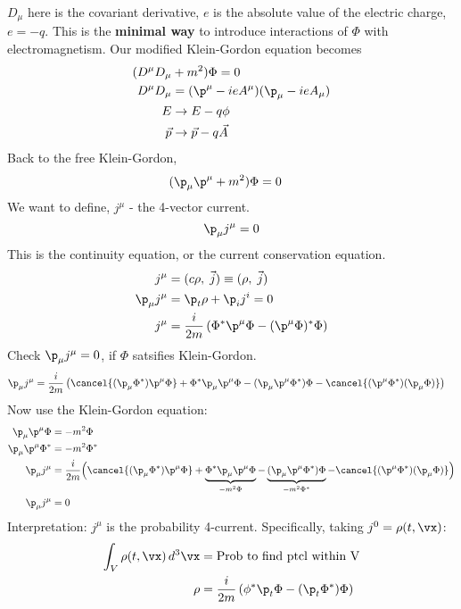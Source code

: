 \documentclass[a4paper, 11pt, normalem]{report}
\begin{document}
$D_\mu$ here is the covariant derivative, $e$ is the absolute value of the electric charge, $e = -q$.
This is the \textbf{minimal way} to introduce interactions of $\Phi$ with electromagnetism.
Our modified Klein-Gordon equation becomes
\begin{align}
    (D^\mu D_\mu &+ m^2)\Phi = 0 \\
    D^\mu D_\mu &= (\p^\mu - ieA^\mu)(\p_\mu - ieA_\mu) \\
    E &\to E - q\phi \\
    \vec{p} &\to \vec{p} - q\vec{A}
\end{align}
Back to the free Klein-Gordon,
\begin{align}
    (\p_\mu\p^\mu &+ m^2)\Phi = 0
\end{align}
We want to define, $j^\mu$ - the 4-vector current.
\begin{equation}
    \p_\mu j^\mu = 0
\end{equation}
This is the continuity equation, or the current conservation equation.
\begin{align}
    j^\mu &= (c\rho,\;\vec{j}) \equiv (\rho,\;\vec{j}) \\
    \p_\mu j^\mu &= \p_t\rho + \p_i j^i = 0 \\
    j^\mu &= \frac{i}{2m}\left(\Phi^*\p^\mu\Phi - (\p^\mu\Phi)^*\Phi\right)
\end{align}
Check $\p_\mu j^\mu = 0$, if $\Phi$ satsifies Klein-Gordon.
\begin{align}
    \p_\mu j^\mu &= \frac{i}{2m}\left(\cancel{(\p_\mu\Phi^*)\p^\mu\Phi} + \Phi^*\p_\mu\p^\mu\Phi - (\p_\mu\p^\mu\Phi^*)\Phi - \cancel{(\p^\mu\Phi^*)(\p_\mu\Phi)} \right)
\end{align}
Now use the Klein-Gordon equation:
\begin{align}
    \p_\mu\p^\mu\Phi &= -m^2\Phi \\
    \p_\mu\p^\mu\Phi^* &= -m^2\Phi^* \\
    \p_\mu j^\mu &= \frac{i}{2m}\Big(\cancel{(\p_\mu\Phi^*)\p^\mu\Phi} + \underbrace{\Phi^*\p_\mu\p^\mu\Phi}_{-m^2\Phi} - \underbrace{(\p_\mu\p^\mu\Phi^*)\Phi}_{-m^2\Phi^*} - \cancel{(\p^\mu\Phi^*)(\p_\mu\Phi)} \Big) \\
    \p_\mu j^\mu &= 0
\end{align}
Interpretation: $j^\mu$ is the probability 4-current.
Specifically, taking $j^0 = \rho(t,\vx)$:
\begin{align}
    \int_V \rho(t,\vx)\,d^3\vx &= \text{Prob to find ptcl within V} \\
    \rho &= \frac{i}{2m}\left(\phi^*\p_t\Phi - (\p_t\Phi^*)\Phi\right)
\end{align}
\end{document}
